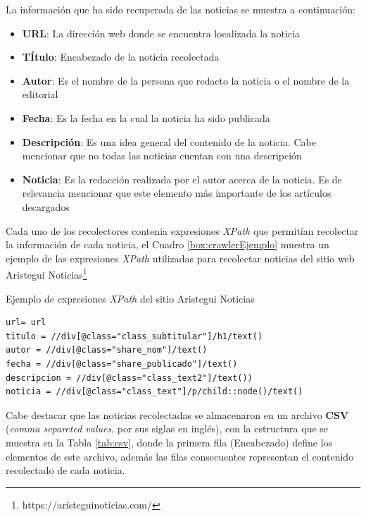 La información que ha sido recuperada de las noticias se muestra a continuación:
\begin{itemize}
	\item \textbf{URL}: La dirección web donde se encuentra localizada la noticia 
	\item \textbf{TÍtulo}: Encabezado de la noticia recolectada
	\item \textbf{Autor}: Es el nombre de la persona que redacto la noticia o el nombre de la editorial
	\item \textbf{Fecha}: Es la fecha en la cual la noticia ha sido publicada
	\item \textbf{Descripción}: Es una idea general del contenido de la noticia. Cabe mencionar que no todas las noticias cuentan con una descripción
	\item \textbf{Noticia}: Es la redacción realizada por el autor acerca de la noticia. Es de relevancia mencionar que este elemento más importante de los artículos decargados 
\end{itemize}

Cada uno de los recolectores contenia expresiones \textit{XPath} que permitían recolectar la información de cada noticia, el Cuadro \ref{box:crawlerEjemplo} muestra un ejemplo de las expresiones \textit{XPath} utilizadas para recolectar noticias del sitio web Aristegui Noticias\footnote{https://aristeguinoticias.com/}\\

\begin{mygraybox}[label={box:crawlerEjemplo}]{Ejemplo de expresiones \textit{XPath} del sitio Aristegui Noticias}
\begin{small}
\begin{verbatim}
url= url
titulo = //div[@class="class_subtitular"]/h1/text()
autor = //div[@class="share_nom"]/text()
fecha = //div[@class="share_publicado"]/text()
descripcion = //div[@class="class_text2"]/text())
noticia = //div[@class="class_text"]/p/child::node()/text()
\end{verbatim}
\end{small}
\end{mygraybox}

Cabe destacar que las noticias recolectadas se almacenaron en un archivo \textbf{CSV} (\textit{comma separeted values}, por sus siglas en inglés), con la estructura que se muestra en la Tabla \ref{tab:csv}, donde la primera fila (Encabezado) define los elementos de este archivo, además las filas consecuentes representan el contenido recolectado de cada noticia.\\


